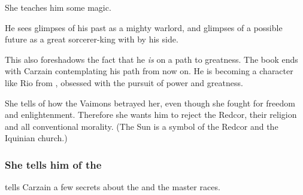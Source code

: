
She teaches him some magic. 


He sees glimpses of his past as a mighty \resphan{} warlord, and glimpses of a possible future as a great sorcerer-king with \Belzir{} by his side. 

This also foreshadows the fact that he \emph{is} on a path to greatness. The book ends with Carzain contemplating his path from now on. He is becoming a character like Rio from \JuukenSentaiGekiranger, obsessed with the pursuit of power and greatness.


She tells of how the  Vaimons betrayed her, even though she fought for freedom and enlightenment. 
Therefore she wants him to reject the Redcor, their religion and all conventional morality. 
(The Sun is a symbol of the Redcor and the Iquinian church.) 






\subsubsection{She tells him of the \Feud}
\Belzir{} tells Carzain a few secrets about the \feud{} and the master races. 

